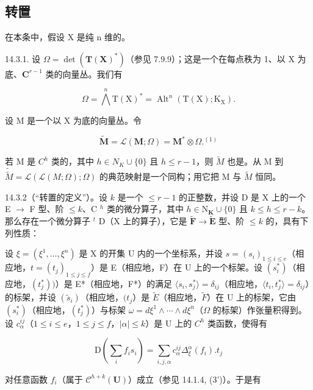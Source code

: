 \subsection{转置}

在本条中，假设 X 是纯 n 维的。

14.3.1. 设 \(\Omega = \det(\mathbf{T}(\mathbf{X})^{*})\)（参见 7.9.9）；这是一个在每点秩为 1、以 X 为底、\(\mathbf{C}^{r-1}\) 类的向量丛。我们有

\[
\Omega = \bigwedge^ {n} \mathrm{T} (\mathrm{X}) ^ {*} = \operatorname{Alt} ^ {n} (\mathrm{T} (\mathrm{X}); \mathrm{K} _ {\mathrm{X}}).
\]

设 M 是一个以 X 为底的向量丛。令

\[
\tilde {\mathbf {M}} = \mathcal {L} (\mathbf {M}; \Omega) = \mathbf {M} ^ {*} \otimes \Omega . ^ {(1)}
\]

若 M 是 \(C^{h}\) 类的，其中 \(h \in N_{K} \cup \{0\}\) 且 \(h \leqslant r - 1\)，则 \(\tilde{M}\) 也是。从 M 到 \(\tilde{\tilde{M}} = \mathcal{L}(\mathcal{L}(M; \Omega); \Omega)\) 的典范映射是一个同构；用它把 M 与 \(\tilde{M}\) 恒同。

14.3.2（“转置的定义”）。设 \(k\) 是一个 \(\leqslant r - 1\) 的正整数，并设 D 是 X 上的一个 E \(\rightarrow\) F 型、阶 \(\leqslant k\)、C \(^{h}\) 类的微分算子，其中 \(h \in \mathrm{N}_{\mathbf{K}} \cup \{0\}\) 且 \(k \leqslant h \leqslant r - k\)。那么存在一个微分算子 \(^{t}\) D（X 上的算子），它是 \(\widetilde{\mathbf{F}} \to \widetilde{\mathbf{E}}\) 型、阶 \(\leqslant k\) 的，具有下列性质：

设 \(\xi = (\xi^1, \ldots, \xi^n)\) 是 X 的开集 U 内的一个坐标系，并设 \(s = (s_i)_{1 \leqslant i \leqslant e}\)（相应地，\(t = (t_j)_{1 \leqslant j \leqslant f}\)）是 E（相应地，F）在 U 上的一个标架。设 \((s_i^*)\)（相应地，\((t_j^*))\)）是 E*（相应地，F*）的满足 \(\langle s_i, s_j^* \rangle = \delta_{ij}\)（相应地，\(\langle t_i, t_j^* \rangle = \delta_{ij}\)）的标架，并设 \((\tilde{s}_i)\)（相应地，\((t_j\)）是 \(\tilde{E}\)（相应地，\(\tilde{F}\)）在 U 上的标架，它由 \((s_i^*)\)（相应地，\((t_j^*)\)）与标架 \(\omega = d\xi^1 \wedge \cdots \wedge d\xi^n\)（\(\Omega\) 的标架）作张量积得到。设 \(c_\alpha^{ij}\)（\(1 \leqslant i \leqslant e\)，\(1 \leqslant j \leqslant f\)，\(|\alpha| \leqslant k\)）是 U 上的 \(C^h\) 类函数，使得有

\[
\mathrm{D} \left(\sum_ {i} f _ {i} s _ {i}\right) = \sum_ {i, j, \alpha} c _ {\alpha} ^ {i j} \Delta_ {\xi} ^ {\alpha} (f _ {i}). t _ {j}
\]

对任意函数 \(f_{i}\)（属于 \(\mathcal{C}^{h+k}(\mathbf{U})\)）成立（参见 14.1.4, (3')）。于是有

